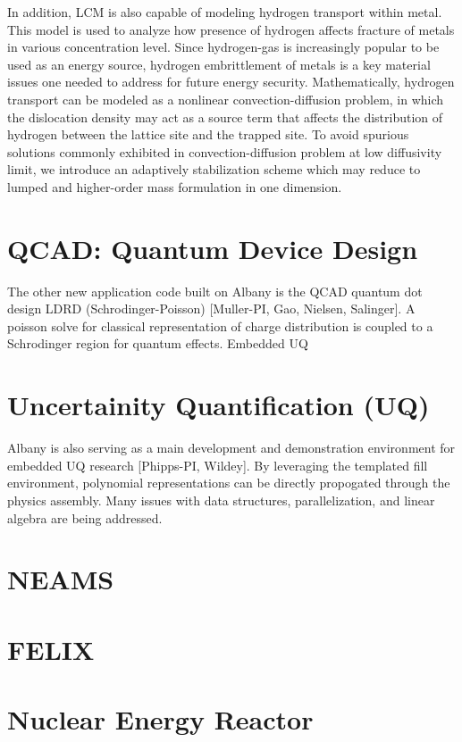 \documentclass[pdf,12pt,report,strict]{SANDreport}
\theoremstyle{remark}
\begin{document}
In addition, LCM is also capable of modeling hydrogen transport within metal. This
 model is used to analyze how presence of hydrogen affects fracture of metals in
 various concentration level. Since hydrogen-gas is increasingly popular to be used as 
 an energy source, hydrogen embrittlement of metals is a key material issues one
needed to address for future energy security. Mathematically, hydrogen transport can
be modeled as a nonlinear convection-diffusion problem, in which the dislocation
density may act as a source term that affects the distribution of hydrogen between
the lattice site and the trapped site. To avoid spurious solutions commonly exhibited
 in convection-diffusion problem at low diffusivity limit, we introduce an adaptively 
stabilization scheme which may reduce to lumped and higher-order mass formulation
in one dimension. 

\section{QCAD: Quantum Device Design}

The other new application code built on Albany is the QCAD quantum dot
design LDRD (Schrodinger-Poisson) [Muller-PI, Gao, Nielsen,
  Salinger]. A poisson solve for classical representation of charge
distribution is coupled to a Schrodinger region for quantum effects.
Embedded UQ

\section {Uncertainity Quantification (UQ)}
Albany is also serving as a main development and demonstration
environment for embedded UQ research [Phipps-PI, Wildey]. By
leveraging the templated fill environment, polynomial representations
can be directly propogated through the physics assembly. Many issues
with data structures, parallelization, and linear algebra are being
addressed.  

\section{NEAMS}

\section{FELIX}

\section{Nuclear Energy Reactor}
\end{document}
